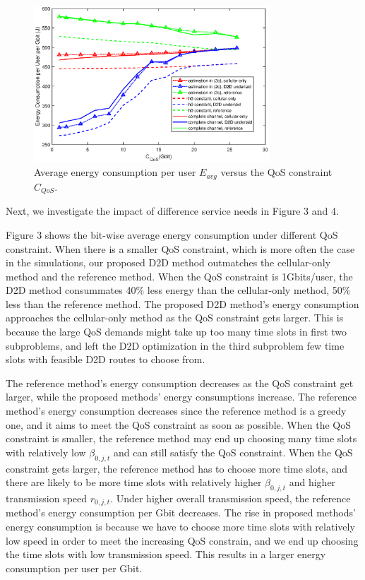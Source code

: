 \documentclass{ieeeaccess}
\begin{document}
\begin{figure} [htb]
\includegraphics*[width=8.8cm]{Cqos.eps}
\caption{Average energy consumption per user $E_{avg}$ versus the QoS constraint ${C_{QoS}}$.}\label{fig:3}
\end{figure}



Next, we investigate the impact of difference service needs in Figure 3 and 4. 

Figure 3 shows the bit-wise average energy consumption under different QoS constraint.
When there is a smaller QoS constraint, which is more often the case in the simulations, our proposed D2D method outmatches the cellular-only method and the reference method. When the QoS constraint is 1Gbits/user, the D2D method consummates 40\% less energy than the cellular-only method, 50\% less than the reference method. The proposed D2D method's energy consumption approaches the cellular-only method as the QoS constraint gets larger. This is because the large QoS demands might take up too many time slots in first two subproblems, and left the D2D optimization in the third subproblem few time slots with feasible D2D routes to choose from.

The reference method's energy consumption decreases as the QoS constraint get larger, while the proposed methods' energy consumptions increase. The reference method's energy consumption decreases since the reference method is a greedy one, and it aims to meet the QoS constraint as soon as possible. When the QoS constraint is smaller, the reference method may end up choosing many time slots with relatively low ${\beta _{0,j,t}}$ and can still satisfy the QoS constraint. When the QoS constraint gets larger, the reference method has to choose more time slots, and there are likely to be more time slots with relatively higher ${\beta _{0,j,t}}$ and higher transmission speed ${r_{0,j,t}}$. Under higher overall transmission speed, the reference method's energy consumption per Gbit decreases. The rise in proposed methods' energy consumption is because we have to choose more time slots with relatively low speed in order to meet the increasing QoS constrain, and we end up choosing the time slots with low transmission speed. This results in a larger energy consumption per user per Gbit. 
\end{document}
